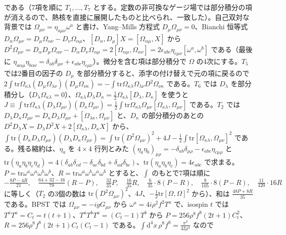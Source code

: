 \documentclass[a4paper,10pt]{ltjsarticle}
\newcommand{\dd}{\mathrm{d}}
\newcommand{\tr}{\mathrm{tr}}
\begin{document}
である（7項を順に $T_1,\dots,T_7$ とする。定数の非可換なゲージ場では部分積分の項が消えるので、熱核を直接に展開したものと比べられ、一致した）。自己双対な背景では $\Omega_{\mu\nu}=\eta_{a\mu\nu}\omega^a$ と書け、Yang--Mills 方程式 $D_\mu\Omega_{\mu\nu}=0$、Bianchi 恒等式 $D_\alpha\Omega_{\mu\nu}=D_\mu\Omega_{\alpha\nu}-D_\nu\Omega_{\alpha\mu}$、$[D_\alpha,D_\mu]X=[\Omega_{\alpha\mu},X]$ から $D^2\Omega_{\mu\nu}=D_\alpha D_\mu\Omega_{\alpha\nu}-D_\alpha D_\nu\Omega_{\alpha\mu}=2[\Omega_{\alpha\mu},\Omega_{\alpha\nu}]=2\epsilon_{abc}\eta_{c\mu\nu}[\omega^a,\omega^b]$ である（最後に $\eta_{a\alpha\mu}\eta_{b\alpha\nu}=\delta_{ab}\delta_{\mu\nu}+\epsilon_{abc}\eta_{c\mu\nu}$）。微分を含む項は部分積分で $\Omega$ の4次にする。$T_5$ では2番目の因子の $D_\mu$ を部分積分すると、添字の付け替えで元の項に戻るので $2\int\tr\Omega_{\kappa\lambda}(D_\mu\Omega_{\lambda\nu})(D_\mu\Omega_{\nu\kappa})=-\int\tr\Omega_{\kappa\lambda}\Omega_{\lambda\nu}D^2\Omega_{\nu\kappa}$ である。$T_6$ では $D_\lambda$ を部分積分し（$D_\lambda\Omega_{\kappa\lambda}=0$）、$\Omega_{\kappa\lambda}D_\lambda D_\kappa=\frac12\Omega_{\kappa\lambda}[D_\lambda,D_\kappa]$ を使うと $J\equiv\int\tr\Omega_{\kappa\lambda}(D_\lambda\Omega_{\mu\nu})(D_\kappa\Omega_{\mu\nu})=\frac12\int\tr\Omega_{\kappa\lambda}\Omega_{\mu\nu}[\Omega_{\kappa\lambda},\Omega_{\mu\nu}]$ である。$T_2$ では $D_\lambda D_\kappa\Omega_{\mu\nu}=D_\kappa D_\lambda\Omega_{\mu\nu}+[\Omega_{\lambda\kappa},\Omega_{\mu\nu}]$ と、$D_\kappa$ の部分積分のあとの $D^2D_\lambda X=D_\lambda D^2X+2[\Omega_{\kappa\lambda},D_\kappa X]$ から、$\int\tr(D_\kappa D_\lambda\Omega_{\mu\nu})(D_\lambda D_\kappa\Omega_{\mu\nu})=\int\tr(D^2\Omega_{\mu\nu})^2+4J-\frac12\int\tr[\Omega_{\kappa\lambda},\Omega_{\mu\nu}]^2$ である。残る縮約は、$\eta_a$ を $4\times4$ 行列とみた $(\eta_a\eta_b)_{\mu\rho}=-\delta_{ab}\delta_{\mu\rho}-\epsilon_{abc}\eta_{c\mu\rho}$ と $\tr(\eta_a\eta_b\eta_c\eta_d)=4(\delta_{ab}\delta_{cd}-\delta_{ac}\delta_{bd}+\delta_{ad}\delta_{bc})$、$\tr(\eta_a\eta_b\eta_c)=4\epsilon_{abc}$ で求まる。$P=\tr\omega^a\omega^a\omega^b\omega^b$、$R=\tr\omega^a\omega^b\omega^a\omega^b$ とすると、$\int$ のもとで7項は順に
\begin{equation*}
-\tfrac{8P-4R}{21},\quad \tfrac{64+32-16}{70}(R-P),\quad \tfrac{32}{35}P,\quad \tfrac{16}{35}R,\quad \tfrac6{35}\cdot8(P-R),\quad \tfrac8{105}\cdot8(P-R),\quad \tfrac{11}{420}\cdot16R
\end{equation*}
に等しく（$T_2$ の3個の数は $\tr(D^2\Omega_{\mu\nu})^2$、$4J$、$-\frac12\tr[\Omega,\Omega]^2$ から）、和は $\frac{48P+8R}{35}$ である。BPST では $\Omega_{\mu\nu}=-igG_{\mu\nu}$ から $\omega^a=4i\rho^2f^2T^a$ で、isospin $t$ では $T^aT^a=C_t=t(t+1)$、$T^aT^bT^a=(C_t-1)T^b$ から $P=256\rho^8f^8(2t+1)C_t^2$、$R=256\rho^8f^8(2t+1)C_t(C_t-1)$ である。$\int\dd^4x\,\rho^8f^8=\frac{\pi^2}{42\rho^4}$ なので
\end{document}
